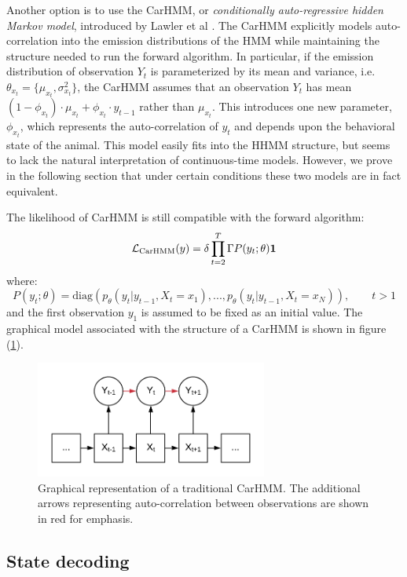 Another option is to use the CarHMM, or \textit{conditionally auto-regressive hidden Markov model}, introduced by Lawler et al \cite{Lawler:2019}. The CarHMM explicitly models auto-correlation into the emission distributions of the HMM while maintaining the structure needed to run the forward algorithm. In particular, if the emission distribution of observation $Y_t$ is parameterized by its mean and variance, i.e. $\theta_{x_t} = \{\mu_{x_t},\sigma^2_{x_t}\}$, the CarHMM assumes that an observation $Y_t$ has mean $(1-\phi_{x_t}) \cdot \mu_{x_t} + \phi_{x_t} \cdot y_{t-1}$ rather than $\mu_{x_t}$. This introduces one new parameter, $\phi_{x_t}$, which represents the auto-correlation of $y_t$ and depends upon the behavioral state of the animal. This model easily fits into the HHMM structure, but seems to lack the natural interpretation of continuous-time models. However, we prove in the following section that under certain conditions these two models are in fact equivalent.

The likelihood of CarHMM is still compatible with the forward algorithm:
\begin{equation}
\mathcal{L}_{\text{CarHMM}}(y) = \delta \prod_{t=2}^T \Gamma P(y_t;\theta) \mathbf{1}
\label{CarHMM_likelihood}
\end{equation}
where:
%
$$P(y_t;\theta) = \text{diag}(p_\theta(y_t|y_{t-1},X_t = x_1), . . . , p_\theta(y_t|y_{t-1},X_t = x_N )), \qquad t > 1$$
%
and the first observation $y_1$ is assumed to be fixed as an initial value. The graphical model associated with the structure of a CarHMM is shown in figure (\ref{fig:CarHMM}).

\begin{figure}[h!]
	\centering
	\includegraphics[width=3in]{../Plots/CarHMM.png}
	\caption{Graphical representation of a traditional CarHMM. The additional arrows representing auto-correlation between observations are shown in red for emphasis.}
	\label{fig:CarHMM}
\end{figure}


\subsection{State decoding}

